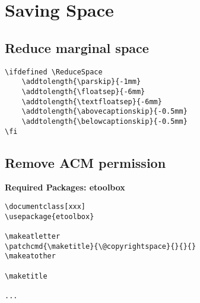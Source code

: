 \section{Saving Space}

\subsection{Reduce marginal space}
\begin{lstlisting}
\ifdefined \ReduceSpace
    \addtolength{\parskip}{-1mm}
    \addtolength{\floatsep}{-6mm}
    \addtolength{\textfloatsep}{-6mm}
    \addtolength{\abovecaptionskip}{-0.5mm}
    \addtolength{\belowcaptionskip}{-0.5mm}
\fi
\end{lstlisting}

\subsection{Remove ACM permission}
\noindent\textbf{Required Packages: etoolbox}
\begin{lstlisting}
\documentclass[xxx]
\usepackage{etoolbox}

\makeatletter
\patchcmd{\maketitle}{\@copyrightspace}{}{}{}
\makeatother

\maketitle

...

\end{lstlisting}